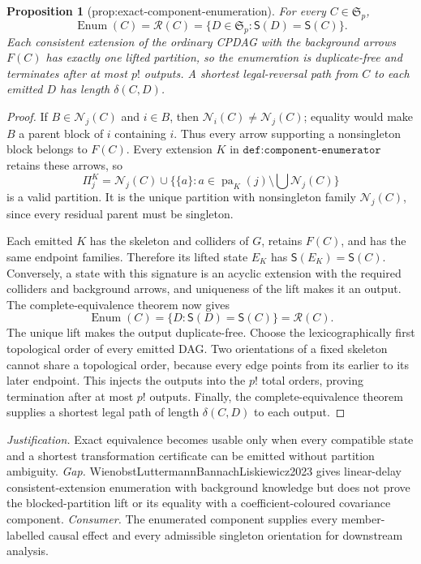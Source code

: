 \documentclass{article}
\newtheorem{proposition}{Proposition}
\begin{document}
\begin{proposition}[prop:exact-component-enumeration]\label{prop:exact-component-enumeration}
For every \(C\in\mathfrak S_p\), \[\operatorname{Enum}(C)=\mathcal R(C)=\{D\in\mathfrak S_p:\mathsf S(D)=\mathsf S(C)\}.\] Each consistent extension of the ordinary CPDAG with the background arrows \(F(C)\) has exactly one lifted partition, so the enumeration is duplicate-free and terminates after at most \(p!\) outputs. A shortest legal-reversal path from \(C\) to each emitted \(D\) has length \(\delta(C,D)\).
\end{proposition}
\begin{proof}
If \(B\in\mathcal N_j(C)\) and \(i\in B\), then \(\mathcal N_i(C)\ne\mathcal N_j(C)\); equality would make \(B\) a parent block of \(i\) containing \(i\).  Thus every arrow supporting a nonsingleton block belongs to \(F(C)\).  Every extension \(K\) in \(\texttt{def:component-enumerator}\) retains these arrows, so
\[
 \Pi^K_j=\mathcal N_j(C)\cup
 \{\{a\}:a\in\operatorname{pa}_K(j)\setminus\bigcup\mathcal N_j(C)\}
\]
is a valid partition.  It is the unique partition with nonsingleton family \(\mathcal N_j(C)\), since every residual parent must be singleton.

Each emitted \(K\) has the skeleton and colliders of \(G\), retains \(F(C)\), and has the same endpoint families.  Therefore its lifted state \(E_K\) has \(\mathsf S(E_K)=\mathsf S(C)\).  Conversely, a state with this signature is an acyclic extension with the required colliders and background arrows, and uniqueness of the lift makes it an output.  The complete-equivalence theorem now gives
\[
 \operatorname{Enum}(C)=\{D:\mathsf S(D)=\mathsf S(C)\}=\mathcal R(C).
\]
The unique lift makes the output duplicate-free.  Choose the lexicographically first topological order of every emitted DAG.  Two orientations of a fixed skeleton cannot share a topological order, because every edge points from its earlier to its later endpoint.  This injects the outputs into the \(p!\) total orders, proving termination after at most \(p!\) outputs.  Finally, the complete-equivalence theorem supplies a shortest legal path of length \(\delta(C,D)\) to each output.
\end{proof}
\par\smallskip\noindent \textit{Justification.} Exact equivalence becomes usable only when every compatible state and a shortest transformation certificate can be emitted without partition ambiguity. \textit{Gap.} WienobstLuttermannBannachLiskiewicz2023 gives linear-delay consistent-extension enumeration with background knowledge but does not prove the blocked-partition lift or its equality with a coefficient-coloured covariance component. \textit{Consumer.} The enumerated component supplies every member-labelled causal effect and every admissible singleton orientation for downstream analysis.
\end{document}
